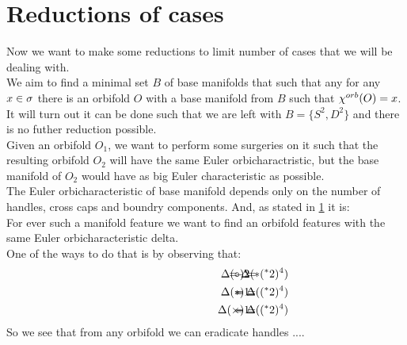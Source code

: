 


\section{Reductions of cases}
Now we want to make some reductions to limit number of cases that we will be dealing with. \\ 
We aim to find a minimal set $B$ of base manifolds that such that any for any $x \in {\sigma}$ there 
is an orbifold $O$ with a base manifold from $B$ such that ${\chi^{orb}(O)} = x$.
It will turn out it can be done such that we are left with $B = \{S^2, D^2\}$ and there is 
no futher reduction possible. \\ 
Given an orbifold $O_1$, we want to perform some surgeries on it such that the resulting orbifold 
$O_2$ will have the same Euler orbicharactristic, but the base manifold of $O_2$ would have as 
big Euler characteristic as possible. \\ 
The Euler orbicharacteristic of base manifold depends only on the number of handles, cross caps 
and boundry components. And, as stated in \ref{} it is: \\ 
For ever such a manifold feature we want to find an orbifold features with the same 
Euler orbicharacteristic delta.  \\
One of the ways to do that is by observing that:
\begin{align}
\hspace{3cm}\Delta(\circ) =& \hspace{-1cm} &-2& \hspace{-1cm} &= \Delta(\ast (^\ast 2)^4) \\
\hspace{3cm}\Delta(\ast) =& \hspace{-1cm} &-1& \hspace{-1cm} &= \Delta((^\ast 2)^4) \\
\hspace{3cm}\Delta(\times) =& \hspace{-1cm} &-1& \hspace{-1cm} &= \Delta((^\ast 2)^4)
\end{align}
So we see that from any orbifold we can eradicate handles ....       


